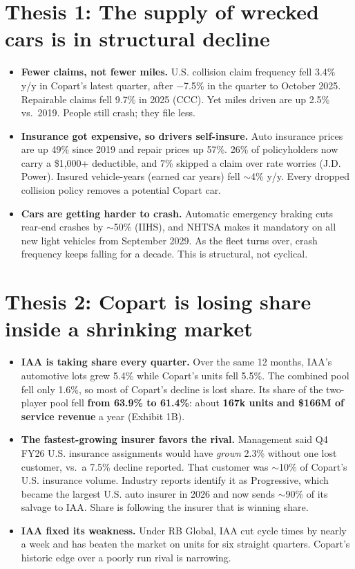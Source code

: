 \documentclass[10pt]{article}
\begin{document}
\section{Thesis 1: The supply of wrecked cars is in structural decline}
\begin{itemize}
  \item \textbf{Fewer claims, not fewer miles.} U.S. collision claim frequency fell 3.4\% y/y in Copart's latest quarter, after $-$7.5\% in the quarter to October 2025. Repairable claims fell 9.7\% in 2025 (CCC). Yet miles driven are up 2.5\% vs.\ 2019. People still crash; they file less.
  \item \textbf{Insurance got expensive, so drivers self-insure.} Auto insurance prices are up 49\% since 2019 and repair prices up 57\%. 26\% of policyholders now carry a \$1,000+ deductible, and 7\% skipped a claim over rate worries (J.D. Power). Insured vehicle-years (earned car years) fell $\sim$4\% y/y. Every dropped collision policy removes a potential Copart car.
  \item \textbf{Cars are getting harder to crash.} Automatic emergency braking cuts rear-end crashes by $\sim$50\% (IIHS), and NHTSA makes it mandatory on all new light vehicles from September 2029. As the fleet turns over, crash frequency keeps falling for a decade. This is structural, not cyclical.
\end{itemize}

\section{Thesis 2: Copart is losing share inside a shrinking market}
\begin{itemize}
  \item \textbf{IAA is taking share every quarter.} Over the same 12 months, IAA's automotive lots grew 5.4\% while Copart's units fell 5.5\%. The combined pool fell only 1.6\%, so most of Copart's decline is lost share. Its share of the two-player pool fell \textbf{from 63.9\% to 61.4\%}: about \textbf{167k units and \$166M of service revenue} a year (Exhibit 1B).
  \item \textbf{The fastest-growing insurer favors the rival.} Management said Q4 FY26 U.S. insurance assignments would have \emph{grown} 2.3\% without one lost customer, vs.\ a 7.5\% decline reported. That customer was $\sim$10\% of Copart's U.S. insurance volume. Industry reports identify it as Progressive, which became the largest U.S. auto insurer in 2026 and now sends $\sim$90\% of its salvage to IAA. Share is following the insurer that is winning share.
  \item \textbf{IAA fixed its weakness.} Under RB Global, IAA cut cycle times by nearly a week and has beaten the market on units for six straight quarters. Copart's historic edge over a poorly run rival is narrowing.
\end{itemize}
\end{document}
